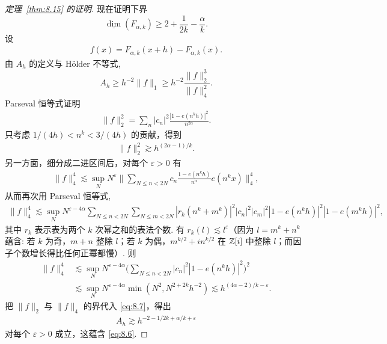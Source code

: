 \begin{proof}[定理~\ref{thm:8.15} 的证明]
现在证明下界
\begin{equation}\label{eq:8.6}
  \underline{\dim}(F_{\alpha,k})\geq 2+\frac{1}{2k}-\frac{\alpha}{k}.
\end{equation}
设
\begin{align*}
  f(x)=F_{\alpha,k}(x+h)-F_{\alpha,k}(x).
\end{align*}
由 $A_{h}$ 的定义与 Hölder 不等式,
\begin{equation}\label{eq:8.7}
  A_{h}\geq h^{-2}\|f\|_{1}\geq h^{-2}\frac{\|f\|_{2}^{3}}{\|f\|_{4}^{2}}.
\end{equation}
Parseval 恒等式证明
\begin{align*}
  \|f\|_{2}^{2}=\sum_{n}|c_{n}|^{2}\frac{|1-e(n^{k}h)|^{2}}{n^{2\alpha}}.
\end{align*}
只考虑 $1/(4h) < n^{k} < 3/(4h)$ 的贡献，得到
\begin{align*}
  \|f\|_{2}^{2}\gtrsim h^{(2\alpha-1)/k}.
\end{align*}
另一方面，细分成二进区间后，对每个 $\varepsilon > 0$ 有
\begin{align*}
  \|f\|_{4}^{4}\lesssim\sup_{N}N^{\varepsilon}
  \Big\|\sum_{N\leq n<2N}c_{n}\frac{1-e(n^{k}h)}{n^{\alpha}}e(n^{k}x)\Big\|_{4}^{4},
\end{align*}
从而再次用 Parseval 恒等式,
\begin{align*}
  \|f\|_{4}^{4}\lesssim\sup_{N}N^{\varepsilon-4\alpha}
  \sum_{N\leq n<2N}\sum_{N\leq m<2N}
  |r_{k}\left(n^{k}+m^{k}\right)|^{2}|c_{n}|^{2}|c_{m}|^{2}
  |1-e(n^{k}h)|^{2}|1-e(m^{k}h)|^{2},
\end{align*}
其中 $r_k$ 表示表为两个 $k$ 次幂之和的表法个数. 有 $r_k(l) \lesssim l^{\varepsilon}$（因为 $l = m^k + n^k$ 蕴含: 若 $k$ 为奇，$m + n$ 整除 $l$；若 $k$ 为偶，$m^{k/2} + in^{k/2}$ 在 $\mathbb{Z}[i]$ 中整除 $l$；而因子个数增长得比任何正幂都慢）. 则
\begin{align*}
  \|f\|_{4}^{4}
  &\lesssim\sup_{N}N^{\varepsilon-4\alpha}
   \Big(\sum_{N\leq n<2N}|c_{n}|^{2}|1-e(n^{k}h)|^{2}\Big)^{2}\\
  &\lesssim\sup_{N}N^{\varepsilon-4\alpha}\min\left(N^{2},N^{2+2k}h^{-2}\right)
  \lesssim h^{(4\alpha-2)/k-\varepsilon}.
\end{align*}
把 $\|f\|_2$ 与 $\|f\|_4$ 的界代入 \eqref{eq:8.7}，得出
\begin{align*}
  A_{h}\gtrsim h^{-2-1/2k+\alpha/k+\varepsilon}
\end{align*}
对每个 $\varepsilon > 0$ 成立，这蕴含 \eqref{eq:8.6}.
\end{proof}

